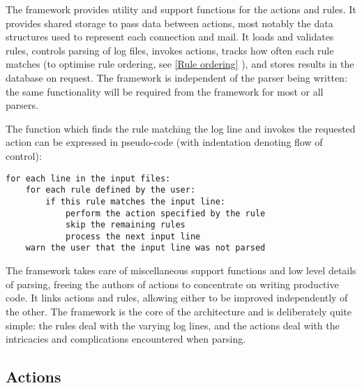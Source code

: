 \documentclass[draft]{svmult}
\newcommand{\refwithpage}[1]{%
    \empty{}\vref{#1}%
}
\newcommand{\sectionref}[1]{%
    \textsection{}\vref*{#1}%
}
\begin{document}
The framework provides utility and support functions for the actions and
rules.  It provides shared storage to pass data between actions, most
notably the data structures used to represent each connection and mail.  It
loads and validates rules, controls parsing of log files, invokes actions,
tracks how often each rule matches (to optimise rule ordering, see
\sectionref{Rule ordering}), and stores results in the database on request.
The framework is independent of the parser being written: the same
functionality will be required from the framework for most or all parsers.

The function which finds the rule matching the log line and invokes the
requested action can be expressed in pseudo-code (with indentation denoting
flow of control):


\begin{verbatim}
for each line in the input files: 
    for each rule defined by the user: 
        if this rule matches the input line:
            perform the action specified by the rule
            skip the remaining rules
            process the next input line
    warn the user that the input line was not parsed
\end{verbatim}

The framework takes care of miscellaneous support functions and low level
details of parsing, freeing the authors of actions to concentrate on
writing productive code.  It links actions and rules, allowing either to be
improved independently of the other.  The framework is the core of the
architecture and is deliberately quite simple: the rules deal with the
varying log lines, and the actions deal with the intricacies and
complications encountered when parsing.

\subsection{Actions}

\label{Actions}
\end{document}
